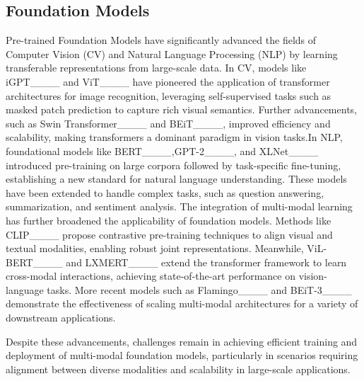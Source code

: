 \subsection{Foundation Models}
Pre-trained Foundation Models have significantly advanced the fields of Computer Vision (CV) and Natural Language Processing (NLP) by learning transferable representations from large-scale data. 
In CV, models like iGPT____ and ViT____ have pioneered the application of transformer architectures for image recognition, leveraging self-supervised tasks such as masked patch prediction to capture rich visual semantics.
Further advancements, such as Swin Transformer____ and BEiT____, improved efficiency and scalability, making transformers a dominant paradigm in vision tasks.In NLP, foundational models like BERT____,GPT-2____, and XLNet____ introduced pre-training on large corpora followed by task-specific fine-tuning, establishing a new standard for natural language understanding. These models have been extended to handle complex tasks, such as question answering, summarization, and sentiment analysis.
The integration of multi-modal learning has further broadened the applicability of foundation models. Methods like CLIP____ propose contrastive pre-training techniques to align visual and textual modalities, enabling robust joint representations. 
Meanwhile, ViL-BERT____ and LXMERT____ extend the transformer framework to learn cross-modal interactions, achieving state-of-the-art performance on vision-language tasks. More recent models such as Flamingo____ and BEiT-3____ demonstrate the effectiveness of scaling multi-modal architectures for a variety of downstream applications.

Despite these advancements, challenges remain in achieving efficient training and deployment of multi-modal foundation models, particularly in scenarios requiring alignment between diverse modalities and scalability in large-scale applications.